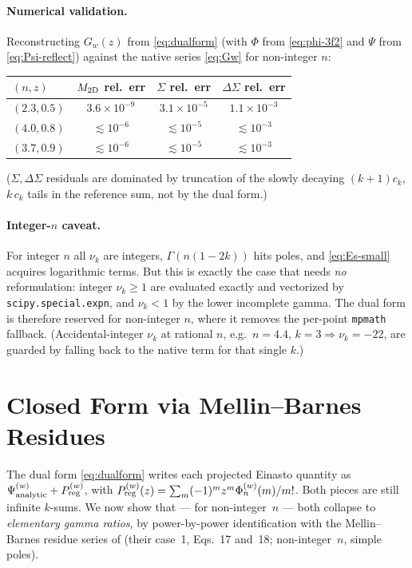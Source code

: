 \documentclass{article}
\begin{document}
\paragraph{Numerical validation.}
Reconstructing $G_w(z)$ from \eqref{eq:dualform} (with $\Phi$ from
\eqref{eq:phi-3f2} and $\Psi$ from \eqref{eq:Psi-reflect}) against the native
series \eqref{eq:Gw} for non-integer $n$:
\begin{center}
\begin{tabular}{lccc}
\toprule
$(n,z)$ & $M_{\rm 2D}$ rel.\ err & $\Sigma$ rel.\ err & $\Delta\Sigma$ rel.\ err\\
\midrule
$(2.3,0.5)$ & $3.6\times10^{-9}$ & $3.1\times10^{-5}$ & $1.1\times10^{-3}$\\
$(4.0,0.8)$ & $\lesssim10^{-6}$  & $\lesssim10^{-5}$  & $\lesssim10^{-3}$\\
$(3.7,0.9)$ & $\lesssim10^{-6}$  & $\lesssim10^{-5}$  & $\lesssim10^{-3}$\\
\bottomrule
\end{tabular}
\end{center}
($\Sigma,\Delta\Sigma$ residuals are dominated by truncation of the slowly
decaying $(k+1)c_k$, $k\,c_k$ tails in the reference sum, not by the dual form.)

\paragraph{Integer-$n$ caveat.}
For integer $n$ all $\nu_k$ are integers, $\Gamma(n(1-2k))$ hits poles, and
\eqref{eq:Es-small} acquires logarithmic terms.  But this is exactly the case
that needs \emph{no} reformulation: integer $\nu_k\ge1$ are evaluated exactly
and vectorized by \texttt{scipy.special.expn}, and $\nu_k<1$ by the lower
incomplete gamma.  The dual form is therefore reserved for non-integer $n$,
where it removes the per-point \texttt{mpmath} fallback.  (Accidental-integer
$\nu_k$ at rational $n$, e.g.\ $n=4.4$, $k=3\Rightarrow\nu_k=-22$, are guarded
by falling back to the native term for that single $k$.)

\section{Closed Form via Mellin--Barnes Residues}
\label{sec:closedform}

\sloppy
The dual form \eqref{eq:dualform} writes each projected Einasto quantity as
$\Psi^{(w)}_{\rm analytic}+P_{\rm reg}^{(w)}$, with
$P_{\rm reg}^{(w)}(z)=\sum_m(-1)^m z^m\Phi^{(w)}_n(m)/m!$.  Both pieces are
still infinite $k$-sums.  We now show that --- for non-integer~$n$ --- both
collapse to \emph{elementary gamma ratios}, by power-by-power identification
with the Mellin--Barnes residue series of \citet{RetanaMontenegro2012} (their case~1,
Eqs.~17 and~18; non-integer~$n$, simple poles).
\end{document}

